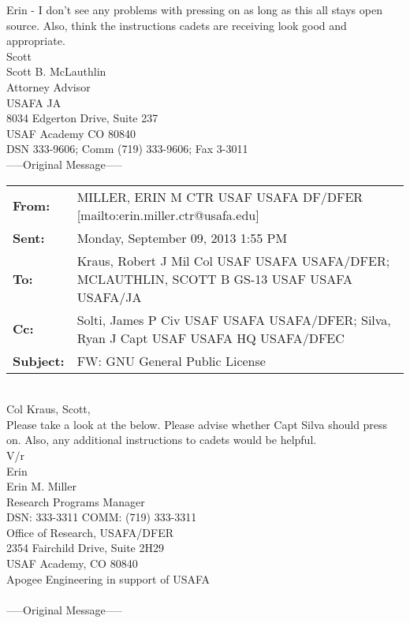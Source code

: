 \documentclass[10pt]{article}
\begin{document}
Erin - I don't see any problems with pressing on as long as this all stays open source.  Also, think the instructions cadets are receiving look good and appropriate. \\

Scott \\

\noindent Scott B. McLauthlin \\
Attorney Advisor \\
USAFA JA \\
8034 Edgerton Drive, Suite 237 \\
USAF Academy CO 80840 \\
DSN 333-9606; Comm (719) 333-9606; Fax 3-3011 \\

\newpage
\noindent-----Original Message----- \\

\noindent \begin{tabu} to \textwidth{l X[l]}

 \textbf{From:} & MILLER, ERIN M CTR USAF USAFA DF/DFER [mailto:erin.miller.ctr@usafa.edu]  \\
 \textbf{Sent:} & Monday, September 09, 2013 1:55 PM \\
 \textbf{To:} & Kraus, Robert J Mil Col USAF USAFA USAFA/DFER; MCLAUTHLIN, SCOTT B GS-13 USAF USAFA USAFA/JA \\
 \textbf{Cc:} & Solti, James P Civ USAF USAFA USAFA/DFER; Silva, Ryan J Capt USAF USAFA HQ USAFA/DFEC \\
 \textbf{Subject:} & FW: GNU General Public License \\
\end{tabu}
\hspace{0pt} \\
Col Kraus, Scott, \\

Please take a look at the below. Please advise whether Capt Silva should press on. Also, any additional instructions to cadets would be helpful. \\

V/r \\

Erin \\

\noindent Erin M. Miller \\
Research Programs Manager \\
DSN: 333-3311 COMM: (719) 333-3311 \\
Office of Research, USAFA/DFER \\
2354 Fairchild Drive, Suite 2H29 \\
USAF Academy, CO 80840 \\
Apogee Engineering in support of USAFA \\
\hspace{0pt} \\
\noindent-----Original Message----- \\
\end{document}

